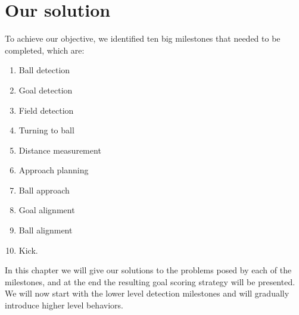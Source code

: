 \chapter{Our solution}

To achieve our objective, we identified ten big milestones that needed to be
completed, which are:

\begin{enumerate}

  \item Ball detection

  \item Goal detection

  \item Field detection

  \item Turning to ball

  \item Distance measurement

  \item Approach planning

  \item Ball approach

  \item Goal alignment

  \item Ball alignment

  \item Kick.

\end{enumerate}

In this chapter we will give our solutions to the problems posed by each of the
milestones, and at the end the resulting goal scoring strategy will be
presented. We will now start with the lower level detection milestones and
will gradually introduce higher level behaviors.
